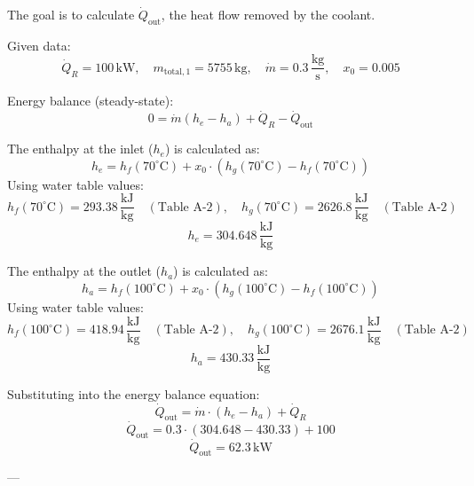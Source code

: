 The goal is to calculate \( \dot{Q}_{\text{out}} \), the heat flow removed by the coolant.  

Given data:  
\[
\dot{Q}_R = 100 \, \text{kW}, \quad m_{\text{total},1} = 5755 \, \text{kg}, \quad \dot{m} = 0.3 \, \frac{\text{kg}}{\text{s}}, \quad x_0 = 0.005
\]  

Energy balance (steady-state):  
\[
0 = \dot{m} (h_e - h_a) + \dot{Q}_R - \dot{Q}_{\text{out}}
\]  

The enthalpy at the inlet (\( h_e \)) is calculated as:  
\[
h_e = h_f(70^\circ\text{C}) + x_0 \cdot \left( h_g(70^\circ\text{C}) - h_f(70^\circ\text{C}) \right)
\]  
Using water table values:  
\[
h_f(70^\circ\text{C}) = 293.38 \, \frac{\text{kJ}}{\text{kg}} \quad (\text{Table A-2}), \quad h_g(70^\circ\text{C}) = 2626.8 \, \frac{\text{kJ}}{\text{kg}} \quad (\text{Table A-2})
\]  
\[
h_e = 304.648 \, \frac{\text{kJ}}{\text{kg}}
\]  

The enthalpy at the outlet (\( h_a \)) is calculated as:  
\[
h_a = h_f(100^\circ\text{C}) + x_0 \cdot \left( h_g(100^\circ\text{C}) - h_f(100^\circ\text{C}) \right)
\]  
Using water table values:  
\[
h_f(100^\circ\text{C}) = 418.94 \, \frac{\text{kJ}}{\text{kg}} \quad (\text{Table A-2}), \quad h_g(100^\circ\text{C}) = 2676.1 \, \frac{\text{kJ}}{\text{kg}} \quad (\text{Table A-2})
\]  
\[
h_a = 430.33 \, \frac{\text{kJ}}{\text{kg}}
\]  

Substituting into the energy balance equation:  
\[
\dot{Q}_{\text{out}} = \dot{m} \cdot (h_e - h_a) + \dot{Q}_R
\]  
\[
\dot{Q}_{\text{out}} = 0.3 \cdot (304.648 - 430.33) + 100
\]  
\[
\dot{Q}_{\text{out}} = 62.3 \, \text{kW}
\]  

---